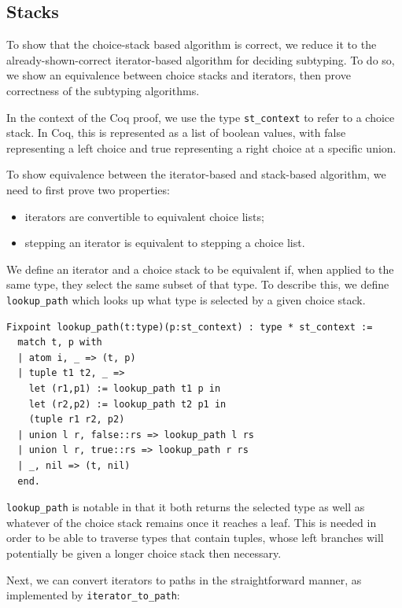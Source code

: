 \documentclass[a4paper,english]{lipics-v2019}
\begin{document}
\subsection{Stacks}

To show that the choice-stack based algorithm is correct, we reduce it to the
already-shown-correct iterator-based algorithm for deciding subtyping. To do so,
we show an equivalence between choice stacks and iterators, then prove correctness
of the subtyping algorithms.

In the context of the Coq proof, we use the type \verb|st_context| to refer
to a choice stack. In Coq, this is represented as a list of boolean values,
with false representing a left choice and true representing a right choice at
a specific union.

To show equivalence between the iterator-based and stack-based algorithm, we need to
first prove two properties:

\begin{itemize}
  \item iterators are convertible to equivalent choice lists;
  \item stepping an iterator is equivalent to stepping a choice list.
\end{itemize}

We define an iterator and a choice stack to be equivalent if, when applied to
the same type, they select the same subset of that type. To describe this, we
define \verb|lookup_path| which looks up what type is selected by a given
choice stack.

\begin{small}\begin{verbatim}
Fixpoint lookup_path(t:type)(p:st_context) : type * st_context :=
  match t, p with
  | atom i, _ => (t, p)
  | tuple t1 t2, _ =>
    let (r1,p1) := lookup_path t1 p in
    let (r2,p2) := lookup_path t2 p1 in
    (tuple r1 r2, p2)
  | union l r, false::rs => lookup_path l rs
  | union l r, true::rs => lookup_path r rs
  | _, nil => (t, nil)
  end.
\end{verbatim}\end{small}

\verb|lookup_path| is notable in that it both returns the selected type as
well as whatever of the choice stack remains once it reaches a leaf. This is
needed in order to be able to traverse types that contain tuples,  whose left
branches will potentially be given a longer choice stack then necessary.

Next, we can convert iterators to paths in the straightforward manner, as
implemented by \verb|iterator_to_path|:
\end{document}
